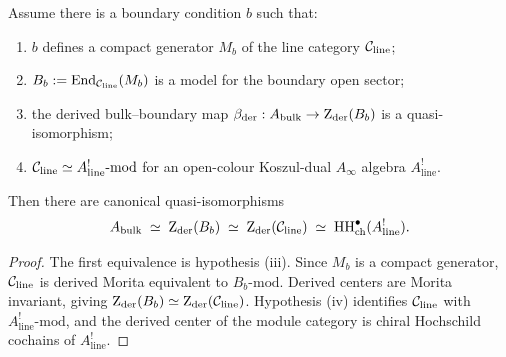 \begin{proposition}%
Assume there is a boundary condition $b$ such that:
\begin{enumerate}[label=(\roman*),leftmargin=1.8em]
\item $b$ defines a compact generator $M_b$ of the line category $\mathcal C_{\mathrm{line}}$;
\item $B_b:=\operatorname{End}_{\mathcal C_{\mathrm{line}}}(M_b)$ is a model for the boundary open sector;
\item the derived bulk--boundary map $\beta_{\mathrm{der}}:A_{\mathrm{bulk}}\to \operatorname{Z}_{\mathrm{der}}(B_b)$ is a quasi-isomorphism;
\item $\mathcal C_{\mathrm{line}}\simeq A^!_{\mathrm{line}}\text{-mod}$ for an open-colour Koszul-dual $A_\infty$ algebra $A^!_{\mathrm{line}}$.
\end{enumerate}
Then there are canonical quasi-isomorphisms
\[
A_{\mathrm{bulk}}
\;\simeq\;
\operatorname{Z}_{\mathrm{der}}(B_b)
\;\simeq\;
\operatorname{Z}_{\mathrm{der}}(\mathcal C_{\mathrm{line}})
\;\simeq\;
\operatorname{HH}^\bullet_{\mathrm{ch}}(A^!_{\mathrm{line}}).
\]
\end{proposition}

\begin{proof}
The first equivalence is hypothesis (iii). Since $M_b$ is a compact generator, $\mathcal C_{\mathrm{line}}$ is derived Morita equivalent to $B_b\text{-mod}$. Derived centers are Morita invariant, giving $\operatorname{Z}_{\mathrm{der}}(B_b)\simeq \operatorname{Z}_{\mathrm{der}}(\mathcal C_{\mathrm{line}})$. Hypothesis (iv) identifies $\mathcal C_{\mathrm{line}}$ with $A^!_{\mathrm{line}}\text{-mod}$, and the derived center of the module category is chiral Hochschild cochains of $A^!_{\mathrm{line}}$.
\end{proof}

